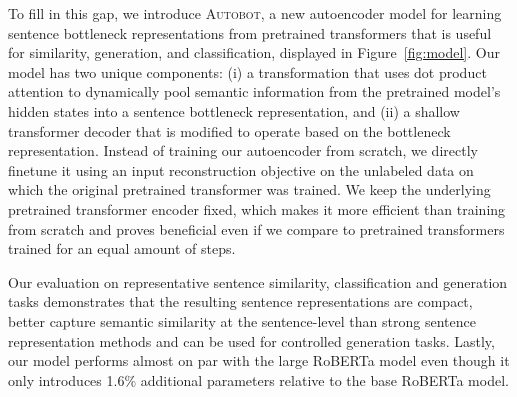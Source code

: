 
To fill in this gap, we introduce \textsc{Autobot}, a new autoencoder model for learning sentence bottleneck representations from pretrained transformers that is useful for similarity,  generation, and classification, displayed in Figure~\ref{fig:model}. Our model has two unique components: (i) a  transformation that uses dot product attention to dynamically pool semantic information from the pretrained model's hidden states into a sentence bottleneck representation, and (ii)  a shallow transformer decoder that is modified to operate based on the bottleneck representation. Instead of training our autoencoder from scratch, we directly finetune it using an input reconstruction objective on the unlabeled data on which the original pretrained transformer was trained. We keep the underlying pretrained transformer encoder fixed, which makes it more efficient than training from scratch
and proves beneficial even if we compare to pretrained transformers trained for an equal amount of steps. 

Our evaluation on representative sentence similarity, classification and generation tasks demonstrates that the   resulting sentence representations are compact, better capture semantic similarity at the sentence-level than strong sentence representation methods \cite{Reimers2019SentenceBERT} and can be used for controlled generation tasks.  Lastly, our model performs almost on par with the large RoBERTa model \citep{liu2019RoBERTa} even though it only introduces 1.6$\%$ additional
parameters relative to the base RoBERTa model. 

